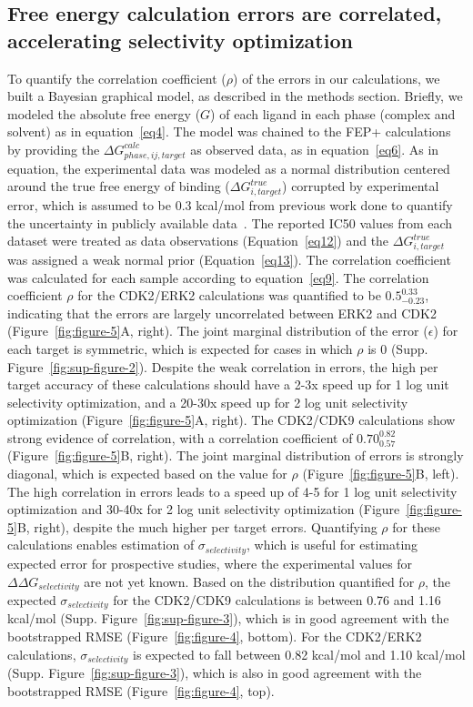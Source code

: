 \documentclass[phd,tocprelim]{cornell}
\begin{document}
\subsection{Free energy calculation errors are correlated, accelerating selectivity optimization}
To quantify the correlation coefficient ($
\rho$) of the errors in our calculations, we built a Bayesian graphical model, as described in the methods section. Briefly, we modeled the absolute free energy ($G$) of each ligand in each phase (complex and solvent) as in equation~\ref{eq4}. The model was chained to the FEP+ calculations by providing the $\Delta G^{calc}_{phase,ij,target}$ as observed data, as in equation~\ref{eq6}. As in equation, the experimental data was modeled as a normal distribution centered around the true free energy of binding ($\Delta G^{true}_{i,target}$) corrupted by experimental error, which is assumed to be 0.3 kcal/mol from previous work done to quantify the uncertainty in publicly available data~\citep{BROWN2009420}. The reported IC50 values from each dataset were treated as data observations (Equation~\ref{eq12}) and the $\Delta G^{true}_{i,target}$ was assigned a weak normal prior (Equation~\ref{eq13}). The correlation coefficient was calculated for each sample according to equation~\ref{eq9}. 
The correlation coefficient $\rho$ for the CDK2/ERK2 calculations was quantified to be $0.5^{0.33}_{-0.23}$, indicating that the errors are largely uncorrelated between ERK2 and CDK2 (Figure~\ref{fig:figure-5}A, right). The joint marginal distribution of the error ($\epsilon$) for each target is symmetric, which is expected for cases in which $\rho$ is 0 (Supp. Figure~\ref{fig:sup-figure-2}). Despite the weak correlation in errors, the high per target accuracy of these calculations should have a 2-3x speed up for 1 log unit selectivity optimization, and a 20-30x speed up for 2 log unit selectivity optimization (Figure~\ref{fig:figure-5}A, right). 
The CDK2/CDK9 calculations show strong evidence of correlation, with a correlation coefficient of $0.70^{0.82}_{0.57}$ (Figure~\ref{fig:figure-5}B, right). The joint marginal distribution of errors is strongly diagonal, which is expected based on the value for $\rho$ (Figure~\ref{fig:figure-5}B, left). The high correlation in errors leads to a speed up of 4-5 for 1 log unit selectivity optimization and 30-40x for 2 log unit selectivity optimization (Figure~\ref{fig:figure-5}B, right), despite the much higher per target errors.
Quantifying $\rho$ for these calculations enables estimation of $\sigma_{selectivity}$, which is useful for estimating expected error for prospective studies, where the experimental values for $\Delta \Delta G_{selectivity}$ are not yet known. Based on the distribution quantified for $\rho$, the expected $\sigma_{selectivity}$ for the CDK2/CDK9 calculations is between 0.76 and 1.16 kcal/mol (Supp. Figure~\ref{fig:sup-figure-3}), which is in good agreement with the bootstrapped RMSE (Figure~\ref{fig:figure-4}, bottom). For the CDK2/ERK2 calculations, $\sigma_{selectivity}$ is expected to fall between 0.82 kcal/mol and 1.10 kcal/mol (Supp. Figure~\ref{fig:sup-figure-3}), which is also in good agreement with the bootstrapped RMSE (Figure~\ref{fig:figure-4}, top). 
\end{document}
